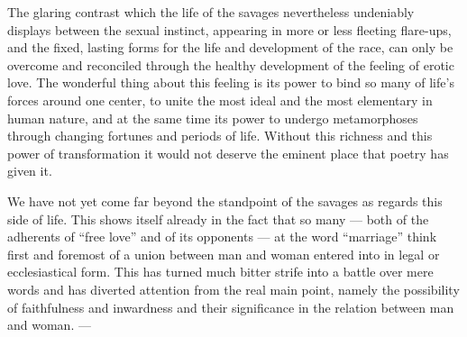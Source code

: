 \documentclass[12pt,a4paper,openany]{book}
\newcommand{\opage}[1]{\marginnote{\footnotesize\textit{[#1]}}}
\begin{document}
The glaring contrast which the life of the savages nevertheless undeniably
displays between the sexual instinct, appearing in more or less fleeting
\opage{794}flare-ups, and the fixed, lasting forms for the life and development of the race,
can only be overcome and reconciled through the healthy development of the
feeling of erotic love. The wonderful thing about this
feeling is its power to bind so many of life's forces
around one center, to unite the most ideal and the most elementary
in human nature, and at the same time its power to undergo
metamorphoses through changing fortunes and periods of life. Without
this richness and this power of transformation it would not deserve
the eminent place that poetry has given it.

We have not yet come far beyond the standpoint of the savages
as regards this side of life. This shows itself already
in the fact that so many --- both of the adherents of ``free love''
and of its opponents --- at the word ``marriage'' think first and
foremost of a union between man and woman entered into in legal
or ecclesiastical form. This has turned much bitter
strife into a battle over mere words and has diverted attention
from the real main point, namely the possibility of faithfulness and
inwardness and their significance in the relation between
man and woman. ---
\end{document}
